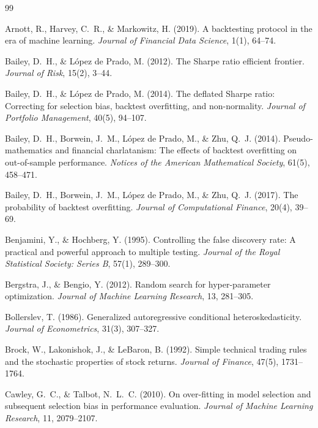 \documentclass[11pt]{article}
\begin{document}
\begin{thebibliography}{99}\setlength{\itemsep}{0pt}\footnotesize

Arnott, R., Harvey, C.~R., \& Markowitz, H. (2019). A backtesting protocol in the era of machine learning. \emph{Journal of Financial Data Science}, 1(1), 64--74.

Bailey, D.~H., \& L\'opez de Prado, M. (2012). The Sharpe ratio efficient frontier. \emph{Journal of Risk}, 15(2), 3--44.

Bailey, D.~H., \& L\'opez de Prado, M. (2014). The deflated Sharpe ratio: Correcting for selection bias, backtest overfitting, and non-normality. \emph{Journal of Portfolio Management}, 40(5), 94--107.

Bailey, D.~H., Borwein, J.~M., L\'opez de Prado, M., \& Zhu, Q.~J. (2014). Pseudo-mathematics and financial charlatanism: The effects of backtest overfitting on out-of-sample performance. \emph{Notices of the American Mathematical Society}, 61(5), 458--471.

Bailey, D.~H., Borwein, J.~M., L\'opez de Prado, M., \& Zhu, Q.~J. (2017). The probability of backtest overfitting. \emph{Journal of Computational Finance}, 20(4), 39--69.

Benjamini, Y., \& Hochberg, Y. (1995). Controlling the false discovery rate: A practical and powerful approach to multiple testing. \emph{Journal of the Royal Statistical Society: Series B}, 57(1), 289--300.

Bergstra, J., \& Bengio, Y. (2012). Random search for hyper-parameter optimization. \emph{Journal of Machine Learning Research}, 13, 281--305.

Bollerslev, T. (1986). Generalized autoregressive conditional heteroskedasticity. \emph{Journal of Econometrics}, 31(3), 307--327.

Brock, W., Lakonishok, J., \& LeBaron, B. (1992). Simple technical trading rules and the stochastic properties of stock returns. \emph{Journal of Finance}, 47(5), 1731--1764.

Cawley, G.~C., \& Talbot, N.~L.~C. (2010). On over-fitting in model selection and subsequent selection bias in performance evaluation. \emph{Journal of Machine Learning Research}, 11, 2079--2107.


\end{thebibliography}
\end{document}
